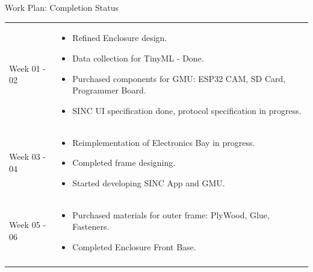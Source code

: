 \documentclass{beamer}
\begin{document}
\begin{frame} {Work Plan: Completion Status}

    \renewcommand\arraystretch{1.75}
    \renewcommand\midrule{{\color{leafColorSecondary} \vspace{-8pt}\rule{\textwidth}{0.75pt}\vspace{8pt}}}


    \begin{tabularx} {\textwidth} {
            >{\bfseries \raggedright \arraybackslash}m{2cm} >{\raggedright \arraybackslash}X
        }

        Week 01 - 02
        &
        \vspace{-0.35cm}
        \begin{itemize}
            \item Refined Enclosure design.
            \item Data collection for TinyML - Done.
            \item Purchased components for GMU: ESP32 CAM, SD Card, Programmer Board.
            \item SINC UI specification done, protocol specification in progress.
        \end{itemize}

        \\ \midrule

        Week 03 - 04
        &
        \vspace{-0.35cm}
        \begin{itemize}
            \item Reimplementation of Electronics Bay in progress.
            \item Completed frame designing.
            \item Started developing SINC App and GMU.
        \end{itemize}
        \\ \midrule

        Week 05 - 06
        &
        \vspace{-0.35cm}
        \begin{itemize}
            \item Purchased materials for outer frame: PlyWood, Glue, Fasteners.
            \item Completed Enclosure Front Base.
        \end{itemize}
        \\ \midrule


\end{tabularx}
\end{frame}
\end{document}
